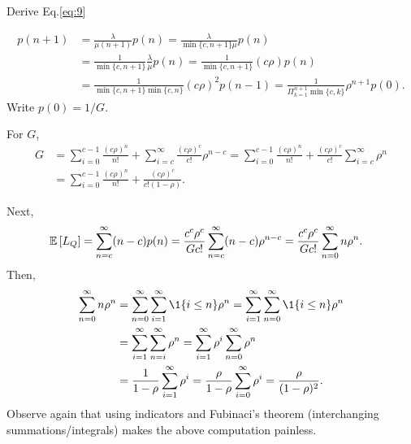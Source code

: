\begin{question}
  Derive Eq.\eqref{eq:9}
  \begin{solution}
    \begin{equation*}
      \begin{split}
       p(n+1) 
&= \frac{\lambda}{\mu(n+1)}p(n) 
= \frac{\lambda}{\min\{c, n+1\} \mu }p(n) \\
&= \frac{1}{\min\{c, n+1\}}\frac\lambda\mu p(n) 
= \frac{1}{\min\{c, n+1\}}(c\rho) p(n) \\
&= \frac{1}{\min\{c, n+1\}\min\{c, n\}}(c\rho)^2 p(n-1) 
= \frac{1}{\Pi_{k=1}^{n+1}\min\{c, k\}}\rho^{n+1} p(0).
      \end{split}
    \end{equation*}
Write $p(0) = 1/G$.  

For  $G$, 
\begin{equation*}
  \begin{split}
  G 
&= 
\sum_{i=0}^{c-1}\frac{(c\rho)^n}{n!} + 
 \sum_{i=c}^{\infty} \frac{(c\rho)^c}{c!} \rho^{n-c} 
= 
\sum_{i=0}^{c-1}\frac{(c\rho)^n}{n!} + 
\frac{(c\rho)^c}{c!} \sum_{i=c}^{\infty} \rho^n \\
&= 
\sum_{i=0}^{c-1}\frac{(c\rho)^n}{n!} + 
\frac{(c\rho)^c}{c!(1-\rho)}.
  \end{split}
\end{equation*}

Next, 
\begin{equation*}
  \begin{split}
  \,\mathbb{E}\left[L_Q\right] 
&=\sum_{n=c}^\infty (n-c) p(n) 
=\frac{c^c\rho^c}{Gc!} \sum_{n=c}^\infty (n-c) \rho^{n-c} 
=\frac{c^c\rho^c}{Gc!} \sum_{n=0}^\infty n \rho^n.
  \end{split}
\end{equation*}
Then, 
\begin{equation*}
  \begin{split}
  \sum_{n=0}^\infty n \rho^n 
&= \sum_{n=0}^\infty \sum_{i=1}^\infty \1{i\leq n} \rho^n
= \sum_{i=1}^\infty   \sum_{n=0}^\infty \1{i\leq n} \rho^n\\
&= \sum_{i=1}^\infty   \sum_{n=i}^\infty \rho^n
= \sum_{i=1}^\infty   \rho^i \sum_{n=0}^\infty \rho^n\\
&= \frac1{1-\rho} \sum_{i=1}^\infty   \rho^i 
= \frac\rho{1-\rho} \sum_{i=0}^\infty   \rho^i 
= \frac\rho{(1-\rho)^2}.
  \end{split}
\end{equation*}
Observe again that using indicators and Fubinaci's theorem
(interchanging summations/integrals) makes the above computation
painless.


\end{solution}
\end{question}
